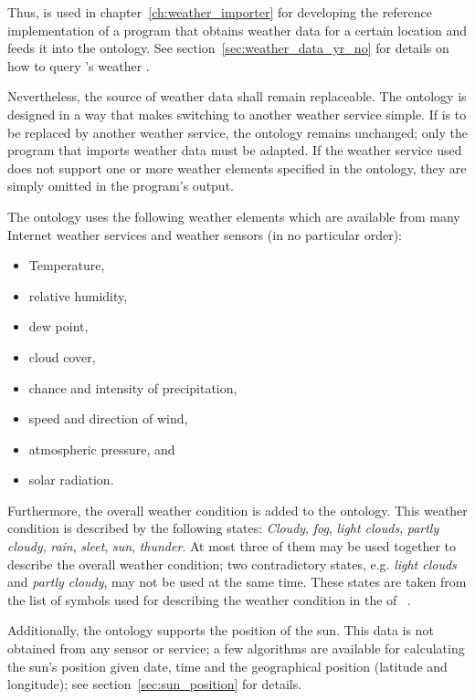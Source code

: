 Thus, \yrno is used in chapter~\ref{ch:weather_importer} for developing the reference implementation of a program that obtains weather data for a certain location and feeds it into the \smarthomeweather ontology. See section~\ref{sec:weather_data_yr_no} for details on how to query \yrno's weather .

Nevertheless, the source of weather data shall remain replaceable. The ontology is designed in a way that makes switching to another weather service simple. If \yrno is to be replaced by another weather service, the ontology remains unchanged; only the program that imports weather data must be adapted. If the weather service used does not support one or more weather elements specified in the ontology, they are simply omitted in the program's output.

The ontology uses the following weather elements which are available from many Internet weather services and weather sensors (in no particular order):
\begin{itemize}
  \item Temperature,
  \item relative humidity,
  \item dew point,
  \item cloud cover,
  \item chance and intensity of precipitation,
  \item speed and direction of wind,
  \item atmospheric pressure, and
  \item solar radiation.
\end{itemize}

Furthermore, the overall weather condition is added to the ontology. This weather condition is described by the following states: \emph{Cloudy}, \emph{fog}, \emph{light clouds}, \emph{partly cloudy}, \emph{rain}, \emph{sleet}, \emph{sun}, \emph{thunder}. At most three of them may be used together to describe the overall weather condition; two contradictory states, e.g. \emph{light clouds} and \emph{partly cloudy}, may not be used at the same time. These states are taken from the list of symbols used for describing the weather condition in the  of \yrno~\cite{yrno_faq}.

Additionally, the ontology supports the position of the sun. This data is not obtained from any sensor or service; a few algorithms are available for calculating the sun's position given date, time and the geographical position (latitude and longitude); see section~\ref{sec:sun_position} for details.

